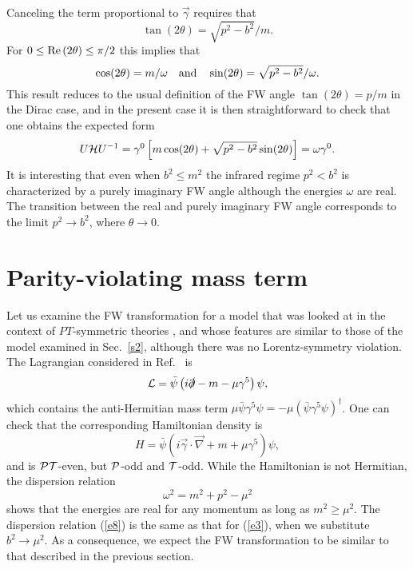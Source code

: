 \documentclass[11pt,prd,aps,amssymb,amsmath,tightenlines,showpacs]{revtex4}
\newcommand{\be}{\begin{equation}}
\newcommand{\ee}{\end{equation}}
\newcommand{\cP}{{\cal P}}
\newcommand{\cT}{{\cal T}}
\newcommand{\cH}{{\cal H}}
\newcommand{\cPT}{{\cal PT}}
\begin{document}
Canceling the term proportional to $\vec\gamma$ requires that
$$\tan(2\theta)=\sqrt{p^2-b^2}/m.$$
For $0\le{\rm Re}\,(2\theta)\le\pi/2$ this implies that
$$\cos(2\theta)=m/\omega\quad{\rm and}\quad\sin(2\theta)=\sqrt{p^2-b^2}/
\omega.$$
This result reduces to the usual definition of the FW angle $\tan(2\theta)=p/m$
in the Dirac case, and in the present case it is then straightforward to check
that one obtains the expected form 
$$U\cH U^{-1}=\gamma^0\left[m\cos(2\theta)+\sqrt{p^2-b^2}\sin(2\theta)\right
]=\omega\gamma^0.$$
It is interesting that even when $b^2\le m^2$ the infrared regime $p^2<b^2$ is
characterized by a purely imaginary FW angle although the energies $\omega$ are
real. The transition between the real and purely imaginary FW angle corresponds
to the limit $p^2\to b^2$, where $\theta\to0$.

\section{Parity-violating mass term}
\label{s3}
Let us examine the FW transformation for a model that was looked at in the
context of $PT$-symmetric theories \cite{r1}, and whose features are similar to
those of the model examined in Sec.~\ref{s2}, although there was no
Lorentz-symmetry violation. The Lagrangian considered in Ref.~\cite{r1} is
\be
{\cal L}=\bar\psi\left(i\slashed\partial-m-\mu\gamma^5\right)\psi,
\label{e7}
\ee
which contains the anti-Hermitian mass term $\mu\bar\psi\gamma^5\psi=-\mu(\bar
\psi\gamma^5\psi)^\dag$. One can check that the corresponding Hamiltonian
density is
$$H=\bar\psi\left(i\vec\gamma\cdot\vec\nabla+m+\mu\gamma^5\right)\psi,$$
and is $\cPT$-even, but $\cP$-odd and $\cT$-odd. While the Hamiltonian is not
Hermitian, the dispersion relation
\be
\omega^2=m^2+p^2-\mu^2
\label{e8}
\ee
shows that the energies are real for any momentum as long as $m^2\ge\mu^2$. The
dispersion relation (\ref{e8}) is the same as that for (\ref{e3}), when we
substitute $b^2\to\mu^2$. As a consequence, we expect the FW transformation to
be similar to that described in the previous section.
\end{document}
